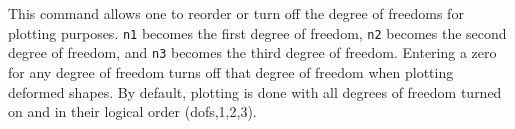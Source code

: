 \headb

This command allows one to reorder or turn off the degree of
freedoms for plotting purposes.  {\tt n1} becomes the first
degree of freedom, {\tt n2} becomes the second degree of freedom,
and {\tt n3} becomes the third degree of freedom.  Entering
a zero for any degree of freedom turns off that degree of
freedom when plotting deformed shapes.  By default, plotting
is done with all degrees of freedom turned on and in their
logical order (dofs,1,2,3).
\vfill
\eject
